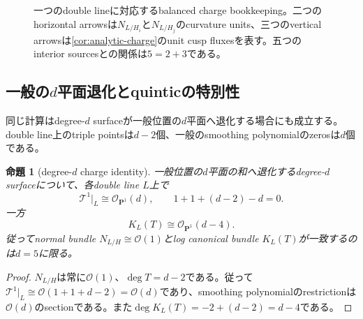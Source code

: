 \documentclass[11pt,a4paper]{ltjsarticle}
\newtheorem{proposition}[theorem]{命題}
\theoremstyle{definition}
\theoremstyle{remark}
\newcommand{\PP}{\mathbf P}
\begin{document}
\begin{figure}[ht]
\centering
{}
\caption{一つのdouble lineに対応するbalanced charge bookkeeping。二つのhorizontal arrowsは$N_{L/H_i}$と$N_{L/H_j}$のcurvature units、三つのvertical arrowsは\cref{cor:analytic-charge}のunit cusp fluxesを表す。五つのinterior sourcesとの関係は$5=2+3$である。}
\label{fig:punctured-neck-charge}
\end{figure}

\subsection{一般の$d$平面退化とquinticの特別性}

同じ計算はdegree-$d$ surfaceが一般位置の$d$平面へ退化する場合にも成立する。double line上のtriple pointsは$d-2$個、一般のsmoothing polynomialのzerosは$d$個である。

\begin{proposition}[degree-$d$ charge identity]\label{prop:degree-d-charge}
一般位置の$d$平面の和へ退化するdegree-$d$ surfaceについて、各double line $L$上で
\[
 \mathcal T^1|_L\cong\mathcal O_{\PP^1}(d),
 \qquad
 1+1+(d-2)-d=0.
\]
一方
\[
 K_L(T)\cong\mathcal O_{\PP^1}(d-4).
\]
従ってnormal bundle $N_{L/H}\cong\mathcal O(1)$とlog canonical bundle $K_L(T)$が一致するのは$d=5$に限る。
\end{proposition}

\begin{proof}
$N_{L/H}$は常に$\mathcal O(1)$、$\deg T=d-2$である。従って
$\mathcal T^1|_L\cong\mathcal O(1+1+d-2)=\mathcal O(d)$であり、smoothing polynomialのrestrictionは$\mathcal O(d)$のsectionである。また$\deg K_L(T)=-2+(d-2)=d-4$である。
\end{proof}
\end{document}
